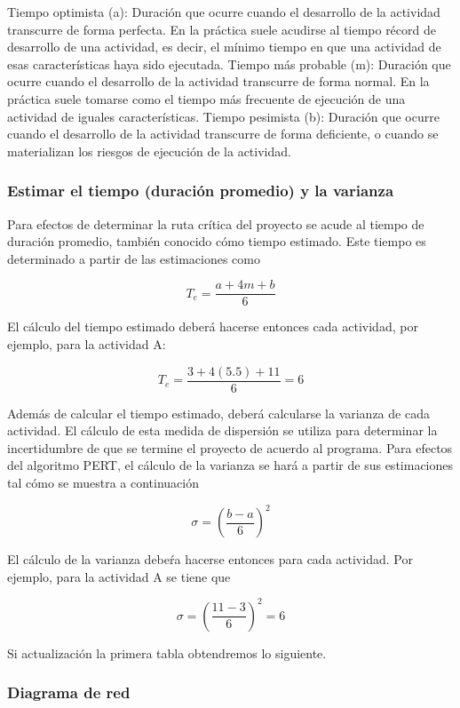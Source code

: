 \documentclass{mylib/reporteCorto}
\begin{document}
Tiempo optimista (a): Duración que ocurre cuando el desarrollo de la actividad transcurre de forma perfecta. En la práctica suele acudirse al tiempo récord de desarrollo de una actividad, es decir, el mínimo tiempo en que una actividad de esas características haya sido ejecutada.
Tiempo más probable (m): Duración que ocurre cuando el desarrollo de la actividad transcurre de forma normal. En la práctica suele tomarse como el tiempo más frecuente de ejecución de una actividad de iguales características.
Tiempo pesimista (b): Duración que ocurre cuando el desarrollo de la actividad transcurre de forma deficiente, o cuando se materializan los riesgos de ejecución de la actividad.


\subsubsection{Estimar el tiempo (duración promedio) y la varianza}

Para efectos de determinar la ruta crítica del proyecto se acude al tiempo de duración promedio, también conocido cómo tiempo estimado. Este tiempo es determinado a partir de las estimaciones como

$$ T_e = \frac{a+4m+b}{6}$$

El cálculo del tiempo estimado deberá hacerse entonces cada actividad, por ejemplo, para la actividad A:

$$T_e = \frac{3+4(5.5)+11}{6} = 6$$

Además de calcular el tiempo estimado, deberá calcularse la varianza de cada actividad. El cálculo de esta medida de dispersión se utiliza para determinar la incertidumbre de que se termine el proyecto de acuerdo al programa. Para efectos del algoritmo PERT, el cálculo de la varianza se hará a partir de sus estimaciones tal cómo se muestra a continuación

$$\sigma = \left(\frac{b-a}{6}\right)^2$$

El cálculo de la varianza debeŕa hacerse entonces para cada actividad. Por ejemplo, para la actividad A se tiene que

$$\sigma = \left(\frac{11-3}{6}\right)^2 = 6$$

Si actualización la primera tabla obtendremos lo siguiente.


\subsubsection{Diagrama de red}
\end{document}
